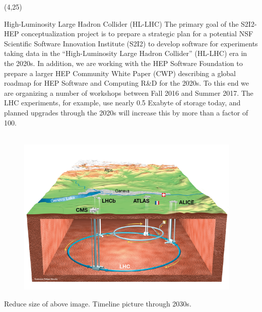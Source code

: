 \documentclass[final]{beamer}
\begin{document}
\begin{frame}{}
\begin{textblock}{38.0}(4,25)
\begin{block}{High-Luminosity Large Hadron Collider (HL-LHC)}
The primary goal of the S2I2-HEP conceptualization project is to
prepare a strategic plan for a potential NSF Scientific Software
Innovation Institute (S2I2) to develop software for experiments
taking data in the ``High-Luminosity Large Hadron Collider'' (HL-LHC)
era in the 2020s. In addition, we are working with the HEP Software
Foundation to prepare a larger HEP Community White Paper (CWP)
describing a global roadmap for HEP Software and Computing R\&D for
the 2020s. To this end we are organizing a number of workshops
between Fall 2016 and Summer 2017.
The LHC experiments, for example, use nearly 0.5 Exabyte of
storage today, and planned upgrades through the 2020s will increase this
by more than a factor of 100. 
~~~ \\
~~~ \\
\begin{figure}[tbph]
\centering
\includegraphics[width=0.96\textwidth]{images/CERN-LHC-cutaway-view-medium.png}
\end{figure}
Reduce size of above image. Timeline picture through 2030s.
\end{block}
\end{textblock}



\end{frame}
\end{document}

